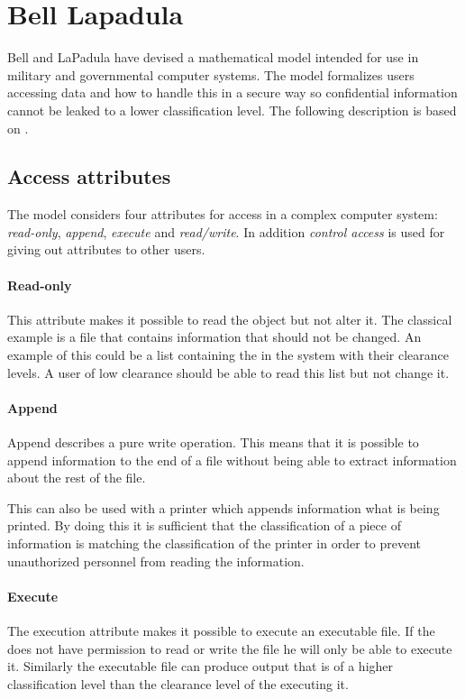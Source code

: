 \section{Bell Lapadula}

Bell and LaPadula have devised a mathematical model intended for use in  military and governmental computer systems.
The model formalizes users accessing data and how to handle this in a secure way so confidential information cannot be leaked to a lower classification level.
The following description is based on \citet{lapadula1996secure}.

\subsection{Access attributes}
The model considers four attributes for access in a complex computer system: \emph{read-only}, \emph{append}, \emph{execute} and \emph{read/write}.
In addition \emph{control access} is used for giving out attributes to other users.

\paragraph{Read-only}
This attribute makes it possible to read the object but not alter it.
The classical example is a file that contains information that should not be changed.
An example of this could be a list containing the \principals{} in the system with their clearance levels.
A user of low clearance should be able to read this list but not change it.

\paragraph{Append}
Append describes a pure write operation.
This means that it is possible to append information to the end of a file without being able to extract information about the rest of the file.

This can also be used with a printer which appends information what is being printed.
By doing this it is sufficient that the classification of a piece of information is matching the classification of the printer in order to prevent unauthorized personnel from reading the information.

\paragraph{Execute}
The execution attribute makes it possible to execute an executable file.
If the \principal{} does not have permission to read or write the file he will only be able to execute it.
Similarly the executable file can produce output that is of a higher classification level than the clearance level of the \principal{} executing it.

